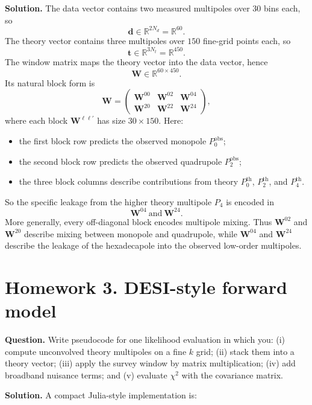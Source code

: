 \documentclass[11pt]{article}
\newcommand{\obs}{\mathrm{obs}}
\newcommand{\thm}{\mathrm{th}}
\newcommand{\W}{\mathbf W}
\newcommand{\tvec}{\mathbf t}
\newcommand{\dvec}{\mathbf d}
\begin{document}
\bigskip
\textbf{Solution.}
The data vector contains two measured multipoles over $30$ bins each, so
\[
\boxed{\dvec\in\mathbb R^{2N_d}=\mathbb R^{60}.}
\]
The theory vector contains three multipoles over $150$ fine-grid points each, so
\[
\boxed{\tvec\in\mathbb R^{3N_t}=\mathbb R^{450}.}
\]
The window matrix maps the theory vector into the data vector, hence
\[
\boxed{\W\in\mathbb R^{60\times 450}.}
\]
Its natural block form is
\[
\boxed{
\W=
\begin{pmatrix}
\W^{00} & \W^{02} & \W^{04}\\
\W^{20} & \W^{22} & \W^{24}
\end{pmatrix},
}
\]
where each block $\W^{\ell\ell'}$ has size $30\times 150$. Here:
\begin{itemize}[leftmargin=*]
    \item the first block row predicts the observed monopole $P_0^{\obs}$;
    \item the second block row predicts the observed quadrupole $P_2^{\obs}$;
    \item the three block columns describe contributions from theory $P_0^{\thm}$, $P_2^{\thm}$, and $P_4^{\thm}$.
\end{itemize}
So the specific leakage from the higher theory multipole $P_4$ is encoded in
\[
\boxed{\W^{04}\ \text{and}\ \W^{24}.}
\]
More generally, every off-diagonal block encodes multipole mixing. Thus $\W^{02}$ and $\W^{20}$ describe mixing between monopole and quadrupole, while $\W^{04}$ and $\W^{24}$ describe the leakage of the hexadecapole into the observed low-order multipoles.

\section*{Homework 3. DESI-style forward model}
\textbf{Question.} Write pseudocode for one likelihood evaluation in which you: (i) compute unconvolved theory multipoles on a fine $k$ grid; (ii) stack them into a theory vector; (iii) apply the survey window by matrix multiplication; (iv) add broadband nuisance terms; and (v) evaluate $\chi^2$ with the covariance matrix.

\bigskip
\textbf{Solution.}
A compact Julia-style implementation is:
\end{document}
